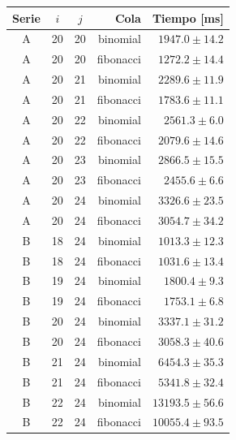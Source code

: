 \begin{tabular}{cccrr}
\hline
Serie & $i$ & $j$ & Cola & Tiempo [ms] \\
\hline
A & 20 & 20 & binomial & $1947.0 \pm 14.2$ \\
A & 20 & 20 & fibonacci & $1272.2 \pm 14.4$ \\
A & 20 & 21 & binomial & $2289.6 \pm 11.9$ \\
A & 20 & 21 & fibonacci & $1783.6 \pm 11.1$ \\
A & 20 & 22 & binomial & $2561.3 \pm 6.0$ \\
A & 20 & 22 & fibonacci & $2079.6 \pm 14.6$ \\
A & 20 & 23 & binomial & $2866.5 \pm 15.5$ \\
A & 20 & 23 & fibonacci & $2455.6 \pm 6.6$ \\
A & 20 & 24 & binomial & $3326.6 \pm 23.5$ \\
A & 20 & 24 & fibonacci & $3054.7 \pm 34.2$ \\
B & 18 & 24 & binomial & $1013.3 \pm 12.3$ \\
B & 18 & 24 & fibonacci & $1031.6 \pm 13.4$ \\
B & 19 & 24 & binomial & $1800.4 \pm 9.3$ \\
B & 19 & 24 & fibonacci & $1753.1 \pm 6.8$ \\
B & 20 & 24 & binomial & $3337.1 \pm 31.2$ \\
B & 20 & 24 & fibonacci & $3058.3 \pm 40.6$ \\
B & 21 & 24 & binomial & $6454.3 \pm 35.3$ \\
B & 21 & 24 & fibonacci & $5341.8 \pm 32.4$ \\
B & 22 & 24 & binomial & $13193.5 \pm 56.6$ \\
B & 22 & 24 & fibonacci & $10055.4 \pm 93.5$ \\
\hline
\end{tabular}
